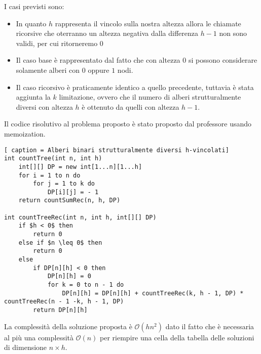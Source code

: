 \documentclass[../cheatSheetAlgoritmi.tex]{subfiles}
\begin{document}
I casi previsti sono: 
\begin{itemize}
	\item In quanto $h$ rappresenta il vincolo sulla nostra altezza allora le chiamate ricorsive che oterranno un altezza negativa dalla differenza $h-1$ non sono validi, per cui ritorneremo $0$
	\item Il caso base è rappresentato dal fatto che con altezza $0$ si possono considerare solamente alberi con $0$ oppure $1$ nodi.
	\item Il caso ricorsivo è praticamente identico a quello precedente, tuttavia è stata aggiunta la $k$ limitazione, ovvero che il numero di alberi strutturalmente diversi con altezza $h$ è ottenuto da quelli con altezza $h - 1$.
\end{itemize}
Il codice risolutivo al problema proposto è stato proposto dal professore usando memoization. 
\begin{lstlisting}[ caption = Alberi binari strutturalmente diversi h-vincolati]
int countTree(int n, int h)
	int[][] DP = new int[1...n][1...h]
	for i = 1 to n do
		for j = 1 to k do
			DP[i][j] = - 1
	return countSumRec(n, h, DP)

int countTreeRec(int n, int h, int[][] DP)
	if $h < 0$ then
		return 0
	else if $n \leq 0$ then
		return 0
	else 
		if DP[n][h] < 0 then
			DP[n][h] = 0
			for k = 0 to n - 1 do
				DP[n][h] = DP[n][h] + countTreeRec(k, h - 1, DP) * countTreeRec(n - 1 -k, h - 1, DP)
		return DP[n][h]
\end{lstlisting}
La complessità della soluzione proposta è $\mathcal{O}(hn^2)$ dato il fatto che è necessaria al più una complessità $\mathcal{O}(n)$ per riempire una cella della tabella delle soluzioni di dimensione $n \times h$.
\newpage
\end{document}
